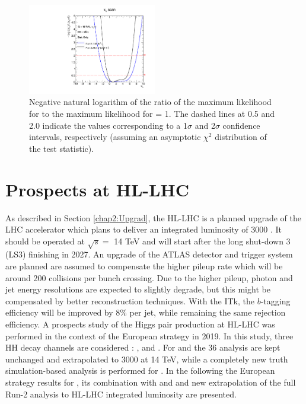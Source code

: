 \begin{figure}[htbp]
    \centering
    \includegraphics[width=0.5\textwidth]{Ch6/Img/likelihood_subplot_Run3.pdf}
    \begin{tcolorbox}[colback=black!5!white, colframe=white!75!black]
    \caption{Negative natural logarithm of the ratio of the maximum likelihood for \kl to the maximum likelihood for \kl= 1. The dashed lines at 0.5 and 2.0 indicate the values corresponding to a 1$\sigma$ and 2$\sigma$ confidence intervals, respectively (assuming an asymptotic $\chi^2$ distribution of the test statistic).}
    \label{fig:Run-3:LH}
    \end{tcolorbox}
\end{figure}

\section{Prospects at HL-LHC}
\label{HL-LHC:HL-LHC}

As described in Section \ref{chap2:Upgrad}, the HL-LHC is a planned upgrade of the LHC accelerator which plans to deliver an integrated luminosity of 3000 \ifb. It should be operated at $\sqrt{s} = $ 14 TeV and will start after the long shut-down 3 (LS3) finishing in 2027. An upgrade of the ATLAS detector and trigger system are planned are assumed to compensate the higher pileup rate which will be around 200 collisions per bunch crossing. Due to the higher pileup, photon and jet energy resolutions are expected to slightly degrade, but this might be compensated by better reconstruction techniques. With the ITk, the $b$-tagging efficiency will be improved by 8\% per jet, while remaining the same rejection efficiency. A prospects study of the Higgs pair production at HL-LHC was performed in the context of the European strategy in 2019. In this study, three HH decay channels are considered : \bbbb, \bbtt and \bbyy. For \bbbb and \bbtt the 36 \ifb analysis are kept unchanged and extrapolated to 3000 \ifb at 14 TeV, while a completely new truth simulation-based analysis is performed for \bbyy. In the following the European strategy results for \HHyybb, its combination with \bbbb and \bbtt and new extrapolation of the full Run-2 \HHyybb analysis to HL-LHC integrated luminosity are presented.

